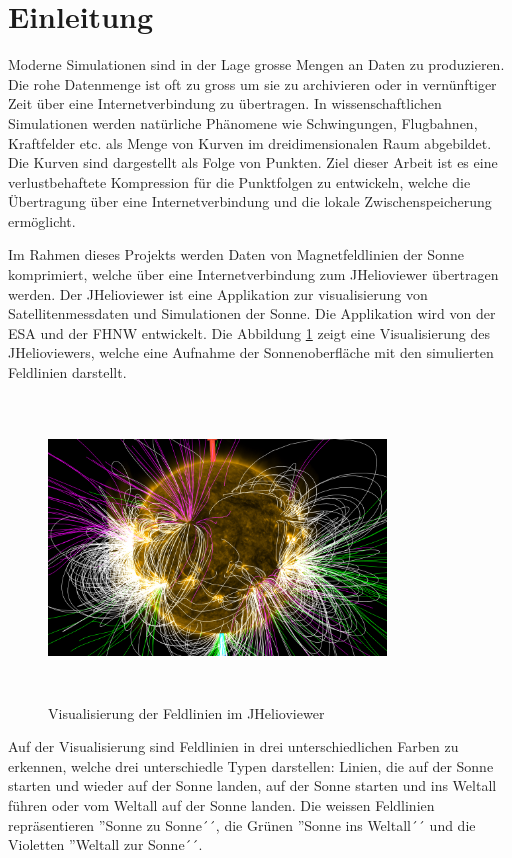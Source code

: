\section{Einleitung}\label{einleitung}
Moderne Simulationen sind in der Lage grosse Mengen an Daten zu produzieren. Die rohe Datenmenge ist oft zu gross um sie zu archivieren oder in vernünftiger Zeit über eine Internetverbindung zu übertragen. In wissenschaftlichen Simulationen werden natürliche Phänomene wie Schwingungen, Flugbahnen, Kraftfelder etc. als Menge von Kurven im dreidimensionalen Raum abgebildet. Die Kurven sind dargestellt als Folge von Punkten. Ziel dieser Arbeit ist es eine verlustbehaftete Kompression für die Punktfolgen zu entwickeln, welche die Übertragung über eine Internetverbindung und die lokale Zwischenspeicherung ermöglicht.

Im Rahmen dieses Projekts werden Daten von Magnetfeldlinien der Sonne komprimiert, welche über eine Internetverbindung zum JHelioviewer übertragen werden. Der JHelioviewer ist eine Applikation zur visualisierung von Satellitenmessdaten und Simulationen der Sonne. Die Applikation wird von der ESA und der FHNW entwickelt. Die Abbildung \ref{einleitung::feldlinien} zeigt eine Visualisierung des JHelioviewers, welche eine Aufnahme der Sonnenoberfläche mit den simulierten Feldlinien darstellt.\\
\begin{figure}[!htbp]
\center
	\includegraphics[width=0.8\textwidth,height=8cm,keepaspectratio]{./pictures/einleitung/fieldLines.png}
	\caption{Visualisierung der Feldlinien im JHelioviewer}
	\label{einleitung::feldlinien}
\end{figure}
Auf der Visualisierung sind Feldlinien in drei unterschiedlichen Farben zu erkennen, welche drei unterschiedle Typen darstellen: Linien, die auf der Sonne starten und wieder auf der Sonne landen, auf der Sonne starten und ins Weltall führen oder vom Weltall auf der Sonne landen. Die weissen Feldlinien repräsentieren ''Sonne zu Sonne´´, die Grünen ''Sonne ins Weltall´´ und die Violetten ''Weltall zur Sonne´´.

